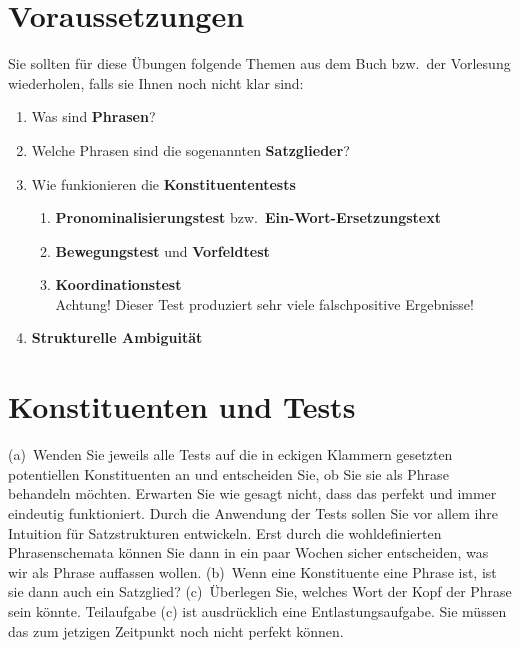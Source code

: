 \section*{Voraussetzungen}

Sie sollten für diese Übungen folgende Themen aus dem Buch bzw.\ der Vorlesung wiederholen, falls sie Ihnen noch nicht klar sind:

\begin{enumerate}\Lf
  \item Was sind \textbf{Phrasen}?
  \item Welche Phrasen sind die sogenannten \textbf{Satzglieder}?
  \item Wie funkionieren die \textbf{Konstituententests}
    \begin{enumerate}\Lf
      \item \textbf{Pronominalisierungstest} bzw.\ \textbf{Ein-Wort-Ersetzungstext}
      \item \textbf{Bewegungstest} und \textbf{Vorfeldtest}
      \item \textbf{Koordinationstest}\\
        Achtung! Dieser Test produziert sehr viele falschpositive Ergebnisse!
    \end{enumerate}
  \item \textbf{Strukturelle Ambiguität}
\end{enumerate}

\section{Konstituenten und Tests}

(a)~Wenden Sie jeweils alle Tests auf die in eckigen Klammern gesetzten potentiellen Konstituenten an und entscheiden Sie, ob Sie sie als Phrase behandeln möchten.
Erwarten Sie wie gesagt nicht, dass das perfekt und immer eindeutig funktioniert.
Durch die Anwendung der Tests sollen Sie vor allem ihre Intuition für Satzstrukturen entwickeln.
Erst durch die wohldefinierten Phrasenschemata können Sie dann in ein paar Wochen sicher entscheiden, was wir als Phrase auffassen wollen.
(b)~Wenn eine Konstituente eine Phrase ist, ist sie dann auch ein Satzglied?
(c)~Überlegen Sie, welches Wort der Kopf der Phrase sein könnte.
Teilaufgabe (c) ist ausdrücklich eine Entlastungsaufgabe.
Sie müssen das zum jetzigen Zeitpunkt noch nicht perfekt können.

\Halbzeile


